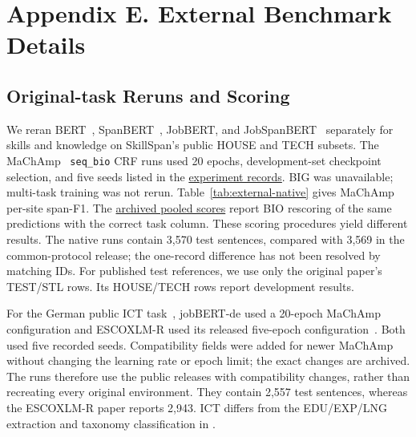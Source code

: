 \FloatBarrier
\section{Appendix E. External Benchmark Details}
\label{app:e}
\subsection{Original-task Reruns and Scoring}
We reran BERT~\citep{devlin2019bert}, SpanBERT~\citep{joshi2020spanbert}, JobBERT, and JobSpanBERT~\citep{zhang2022skillspan} separately for skills and knowledge on SkillSpan's public HOUSE and TECH subsets. The MaChAmp~\citep{vandergoot2021machamp} \texttt{seq\_bio} CRF runs used 20 epochs, development-set checkpoint selection, and five seeds listed in the \href{https://github.com/AlfredJamesLi/chinese-skillspan-benchmark/blob/36f009fab01b8433355cb7ef5af8fad02c6cc519/reproduction/process_archive_20260924/source/tex/external_benchmarks/paper_appendix.tex}{experiment records}. BIG was unavailable; multi-task training was not rerun. Table~\ref{tab:external-native} gives MaChAmp per-site span-F1. The \href{https://github.com/AlfredJamesLi/chinese-skillspan-benchmark/blob/36f009fab01b8433355cb7ef5af8fad02c6cc519/reproduction/process_archive_20260924/README.md#skillspan-pooled-scores-previous-table-25}{archived pooled scores} report BIO rescoring of the same predictions with the correct task column. These scoring procedures yield different results. The native runs contain 3,570 test sentences, compared with 3,569 in the common-protocol release; the one-record difference has not been resolved by matching IDs. For published test references, we use only the original paper's TEST/STL rows. Its HOUSE/TECH rows report development results.

For the German public ICT task~\citep{gnehm2022transfer}, jobBERT-de used a 20-epoch MaChAmp configuration and ESCOXLM-R used its released five-epoch configuration~\citep{zhang2023escoxlmr}. Both used five recorded seeds. Compatibility fields were added for newer MaChAmp without changing the learning rate or epoch limit; the exact changes are archived. The runs therefore use the public releases with compatibility changes, rather than recreating every original environment. They contain 2,557 test sentences, whereas the ESCOXLM-R paper reports 2,943. ICT differs from the EDU/EXP/LNG extraction and taxonomy classification in \citet{gnehm2022skills}.

